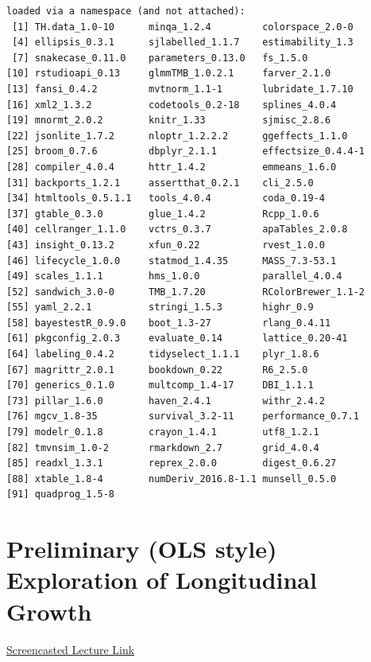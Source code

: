 \documentclass[
  english,
]{book}
\begin{document}
\begin{verbatim}
loaded via a namespace (and not attached):
 [1] TH.data_1.0-10      minqa_1.2.4         colorspace_2.0-0   
 [4] ellipsis_0.3.1      sjlabelled_1.1.7    estimability_1.3   
 [7] snakecase_0.11.0    parameters_0.13.0   fs_1.5.0           
[10] rstudioapi_0.13     glmmTMB_1.0.2.1     farver_2.1.0       
[13] fansi_0.4.2         mvtnorm_1.1-1       lubridate_1.7.10   
[16] xml2_1.3.2          codetools_0.2-18    splines_4.0.4      
[19] mnormt_2.0.2        knitr_1.33          sjmisc_2.8.6       
[22] jsonlite_1.7.2      nloptr_1.2.2.2      ggeffects_1.1.0    
[25] broom_0.7.6         dbplyr_2.1.1        effectsize_0.4.4-1 
[28] compiler_4.0.4      httr_1.4.2          emmeans_1.6.0      
[31] backports_1.2.1     assertthat_0.2.1    cli_2.5.0          
[34] htmltools_0.5.1.1   tools_4.0.4         coda_0.19-4        
[37] gtable_0.3.0        glue_1.4.2          Rcpp_1.0.6         
[40] cellranger_1.1.0    vctrs_0.3.7         apaTables_2.0.8    
[43] insight_0.13.2      xfun_0.22           rvest_1.0.0        
[46] lifecycle_1.0.0     statmod_1.4.35      MASS_7.3-53.1      
[49] scales_1.1.1        hms_1.0.0           parallel_4.0.4     
[52] sandwich_3.0-0      TMB_1.7.20          RColorBrewer_1.1-2 
[55] yaml_2.2.1          stringi_1.5.3       highr_0.9          
[58] bayestestR_0.9.0    boot_1.3-27         rlang_0.4.11       
[61] pkgconfig_2.0.3     evaluate_0.14       lattice_0.20-41    
[64] labeling_0.4.2      tidyselect_1.1.1    plyr_1.8.6         
[67] magrittr_2.0.1      bookdown_0.22       R6_2.5.0           
[70] generics_0.1.0      multcomp_1.4-17     DBI_1.1.1          
[73] pillar_1.6.0        haven_2.4.1         withr_2.4.2        
[76] mgcv_1.8-35         survival_3.2-11     performance_0.7.1  
[79] modelr_0.1.8        crayon_1.4.1        utf8_1.2.1         
[82] tmvnsim_1.0-2       rmarkdown_2.7       grid_4.0.4         
[85] readxl_1.3.1        reprex_2.0.0        digest_0.6.27      
[88] xtable_1.8-4        numDeriv_2016.8-1.1 munsell_0.5.0      
[91] quadprog_1.5-8     
\end{verbatim}

\hypertarget{MLMexplore}{%
\chapter{Preliminary (OLS style) Exploration of Longitudinal Growth}\label{MLMexplore}}

\href{https://spu.hosted.panopto.com/Panopto/Pages/Viewer.aspx?pid=36075f1d-b805-40b9-92da-ad2b0053f46c}{Screencasted Lecture Link}
\end{document}

